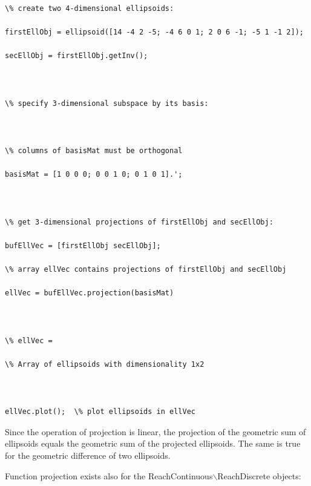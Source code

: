 \documentclass[letterpaper,10pt,english]{sphinxmanual}
\begin{document}
\begin{Verbatim}[commandchars=\\\{\}]
\% create two 4-dimensional ellipsoids:

firstEllObj = ellipsoid([14 -4 2 -5; -4 6 0 1; 2 0 6 -1; -5 1 -1 2]);

secEllObj = firstEllObj.getInv();



\% specify 3-dimensional subspace by its basis:



\% columns of basisMat must be orthogonal

basisMat = [1 0 0 0; 0 0 1 0; 0 1 0 1].'; 



\% get 3-dimensional projections of firstEllObj and secEllObj:

bufEllVec = [firstEllObj secEllObj];

\% array ellVec contains projections of firstEllObj and secEllObj

ellVec = bufEllVec.projection(basisMat)  



\% ellVec =

\% Array of ellipsoids with dimensionality 1x2



ellVec.plot();  \% plot ellipsoids in ellVec
\end{Verbatim}

Since the operation of projection is linear, the projection of the
geometric sum of ellipsoids equals the geometric sum of the projected
ellipsoids. The same is true for the geometric difference of two
ellipsoids.

Function projection exists also for the
ReachContinuous$\backslash$ReachDiscrete objects:
\end{document}
